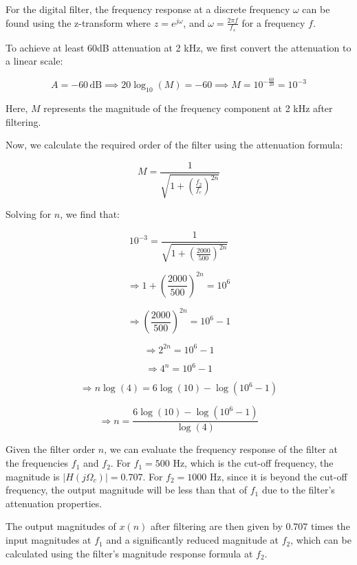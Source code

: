 \documentclass{article}
\begin{document}
For the digital filter, the frequency response at a discrete frequency $\omega$ can be found using the z-transform where $z = e^{j\omega}$, and $\omega = \frac{2\pi f}{f_s}$ for a frequency $f$. 

To achieve at least 60dB attenuation at 2 kHz, we first convert the attenuation to a linear scale:

\[
A = -60 \, \text{dB} \implies 20 \log_{10}(M) = -60 \implies M = 10^{-\frac{60}{20}} = 10^{-3}
\]

Here, $M$ represents the magnitude of the frequency component at 2 kHz after filtering.

Now, we calculate the required order of the filter using the attenuation formula:

\[
M = \frac{1}{\sqrt{1 + \left(\frac{f_2}{f_c}\right)^{2n}}}
\]

Solving for $n$, we find that:

\[
10^{-3} = \frac{1}{\sqrt{1 + \left(\frac{2000}{500}\right)^{2n}}}
\]

\[
\Rightarrow 1 + \left(\frac{2000}{500}\right)^{2n} = 10^{6}
\]

\[
\Rightarrow \left(\frac{2000}{500}\right)^{2n} = 10^{6} - 1
\]

\[
\Rightarrow 2^{2n} = 10^{6} - 1
\]

\[
\Rightarrow 4^{n} = 10^{6} - 1
\]

\[
\Rightarrow n \log(4) = 6 \log(10) - \log(10^{6} - 1)
\]

\[
\Rightarrow n = \frac{6 \log(10) - \log(10^{6} - 1)}{\log(4)}
\]

Given the filter order $n$, we can evaluate the frequency response of the filter at the frequencies $f_1$ and $f_2$. For $f_1 = 500$ Hz, which is the cut-off frequency, the magnitude is $|H(j\Omega_{c})| = 0.707$. For $f_2 = 1000$ Hz, since it is beyond the cut-off frequency, the output magnitude will be less than that of $f_1$ due to the filter's attenuation properties.

The output magnitudes of $x(n)$ after filtering are then given by $0.707$ times the input magnitudes at $f_1$ and a significantly reduced magnitude at $f_2$, which can be calculated using the filter's magnitude response formula at $f_2$.
\end{document}
